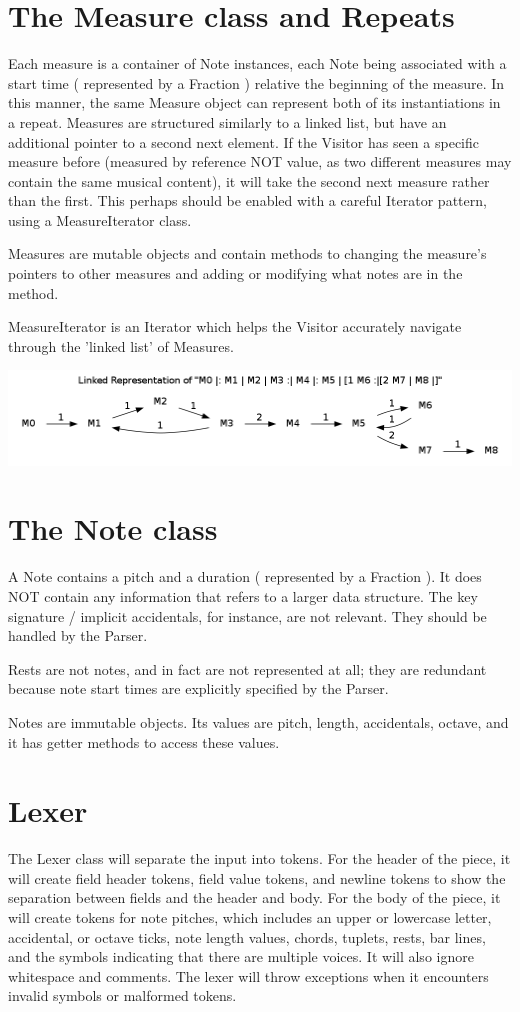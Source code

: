 \documentclass{amsart}
\begin{document}
\section{ The Measure class and Repeats }

Each measure is a container of Note instances, each Note being associated with a start time ( represented by a Fraction ) relative the beginning of the measure. In this manner, the same Measure object can represent both of its instantiations in a repeat. Measures are structured similarly to a linked list, but have an additional pointer to a second next element. If the Visitor has seen a specific measure before (measured by reference NOT value, as two different measures may contain the same musical content), it will take the second next measure rather than the first. This perhaps should be enabled with a careful Iterator pattern, using a MeasureIterator class.  

Measures are mutable objects and contain methods to changing the measure's pointers to other measures and adding or modifying what notes are in the method.  

MeasureIterator is an Iterator which helps the Visitor accurately navigate through the 'linked list' of Measures.  

\includegraphics[width=\linewidth]{measure_example.png}

\section{ The Note class }
A Note contains a pitch and a duration  ( represented by a Fraction ).  It does NOT contain any information that refers to a larger data structure. The key signature / implicit accidentals, for instance, are not relevant. They should be handled by the Parser.

Rests are not notes, and in fact are not represented at all; they are redundant because note start times are explicitly specified by the Parser.

Notes are immutable objects.  Its values are pitch, length, accidentals, octave, and it has getter methods to access these values.  

\section{ Lexer }
The Lexer class will separate the input into tokens.  For the header of the piece, it will create field header tokens, field value tokens, and newline tokens to show the separation between fields and the header and body.  
For the body of the piece, it will create tokens for note pitches, which includes an upper or lowercase letter, accidental, or octave ticks, note length values, chords, tuplets, rests, bar lines, and the symbols indicating that there are multiple voices.  It will also ignore whitespace and comments.
The lexer will throw exceptions when it encounters invalid symbols or malformed tokens.  
\end{document}
